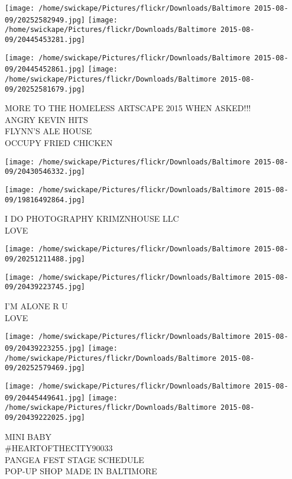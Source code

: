 \documentclass[10pt,letterpaper]{article}
\begin{document}
\texttt{[image: /home/swickape/Pictures/flickr/Downloads/Baltimore 2015-08-09/20252582949.jpg]}
\texttt{[image: /home/swickape/Pictures/flickr/Downloads/Baltimore 2015-08-09/20445453281.jpg]}

\texttt{[image: /home/swickape/Pictures/flickr/Downloads/Baltimore 2015-08-09/20445452861.jpg]}
\texttt{[image: /home/swickape/Pictures/flickr/Downloads/Baltimore 2015-08-09/20252581679.jpg]}

MORE TO THE HOMELESS ARTSCAPE 2015 WHEN ASKED!!!\\
ANGRY KEVIN HITS\\
FLYNN'S ALE HOUSE\\
OCCUPY FRIED CHICKEN\\
\pagebreak

\texttt{[image: /home/swickape/Pictures/flickr/Downloads/Baltimore 2015-08-09/20430546332.jpg]}

\vspace{0.25in}
\texttt{[image: /home/swickape/Pictures/flickr/Downloads/Baltimore 2015-08-09/19816492864.jpg]}

I DO PHOTOGRAPHY KRIMZNHOUSE LLC\\
LOVE\\
\pagebreak

\texttt{[image: /home/swickape/Pictures/flickr/Downloads/Baltimore 2015-08-09/20251211488.jpg]}

\vspace{0.25in}
\texttt{[image: /home/swickape/Pictures/flickr/Downloads/Baltimore 2015-08-09/20439223745.jpg]}

I'M ALONE R U\\
LOVE\\
\pagebreak

\texttt{[image: /home/swickape/Pictures/flickr/Downloads/Baltimore 2015-08-09/20439223255.jpg]}
\texttt{[image: /home/swickape/Pictures/flickr/Downloads/Baltimore 2015-08-09/20252579469.jpg]}

\texttt{[image: /home/swickape/Pictures/flickr/Downloads/Baltimore 2015-08-09/20445449641.jpg]}
\texttt{[image: /home/swickape/Pictures/flickr/Downloads/Baltimore 2015-08-09/20439222025.jpg]}

MINI BABY\\
\#HEARTOFTHECITY90033\\
PANGEA FEST STAGE SCHEDULE\\
POP{-}UP SHOP MADE IN BALTIMORE\\
\pagebreak
\end{document}

